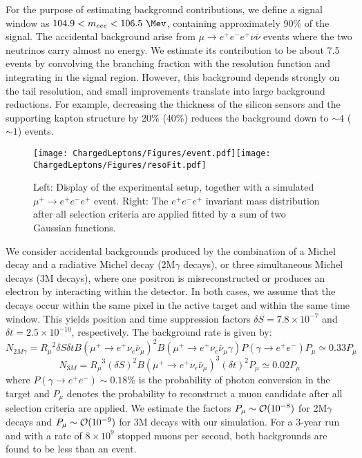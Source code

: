 For the purpose of estimating background contributions, we define a signal window as $ 104.9 < m_{eee} < 106.5 ~\Mev$, containing approximately 90\% of the signal. The accidental background arise from $\mu \rightarrow e^+e^-e^+ \nu\bar\nu$ events where the two neutrinos carry almost no energy. We estimate its contribution to be about 7.5 events by convolving the branching fraction with the resolution function and integrating in the signal region. However, this background depends strongly on the tail resolution, and small improvements translate into large background reductions. For example, decreasing the thickness of the silicon sensors and the supporting kapton structure by 20\% (40\%) reduces the background down to $\sim 4$ ($\sim 1$) events. 

\begin{figure}[htb]
\begin{center}
\texttt{[image: ChargedLeptons/Figures/event.pdf]}\texttt{[image: ChargedLeptons/Figures/resoFit.pdf]}
\end{center}
\caption{Left: Display of the experimental setup, together with a simulated $\mu^+ \rightarrow e^+e^-e^+$ event. 
Right:  The $e^+e^-e^+$ invariant mass distribution after all selection criteria are applied fitted by a 
sum of two Gaussian functions.}
\label{Fig::mu3e}
\end{figure}

We consider accidental backgrounds produced by the combination of a Michel decay and a radiative Michel decay (2M$\gamma$ decays), or three simultaneous Michel decays (3M decays), where one positron is misreconstructed or produces an electron by interacting within the detector. In both cases, we assume that
the decays occur within the same pixel in the active target and within the same time window. This yields position and time suppression factors $\delta S = 7.8\times 10^{-7}$ and $\delta t = 2.5\times 10^{-10}$, respectively. The background rate is given by:
%
$$N_{2M\gamma} = {R_\mu}^2 \delta S \delta t {B(\mu^+ \rightarrow e^+ \nu_e \bar\nu_\mu)}^2 B(\mu^+ \rightarrow e^+ \nu_e \bar\nu_\mu \gamma) P(\gamma \rightarrow e^+ e^-)  P_\mu  \simeq 0.33 P_\mu$$
$$N_{3M} = {R_\mu}^3(\delta S)^2 {B(\mu^+ \rightarrow e^+ \nu_e \bar\nu_\mu)}^3 (\delta t)^2 P_\mu \simeq 0.02 P_\mu$$
%
where $P(\gamma \rightarrow e^+ e^-)\sim 0.18\%$ is the probability of photon conversion in the target and $P_\mu$ denotes the probability to reconstruct a muon candidate after all selection criteria are applied. We estimate the factors $P_\mu \sim {\cal O}(10^{-8})$ for 2M$\gamma$ decays and $P_\mu \sim {\cal O}(10^{-9})$ for 3M decays with our simulation. For a 3-year run and with a rate of $8\times 10^{9}$ stopped muons per second, both backgrounds are found to be less than an event.


